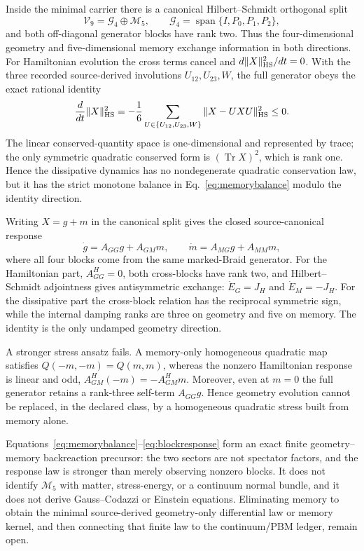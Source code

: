 \documentclass[11pt]{article}
\theoremstyle{definition}
\theoremstyle{remark}
\begin{document}
Inside the minimal carrier there is a canonical Hilbert--Schmidt orthogonal split
\begin{equation}
 \mathcal V_9=\mathcal G_4\oplus\mathcal M_5,
 \qquad \mathcal G_4=\operatorname{span}\{I,P_0,P_1,P_2\},
\end{equation}
and both off-diagonal generator blocks have rank two. Thus the four-dimensional geometry and five-dimensional memory exchange information in both directions. For Hamiltonian evolution the cross terms cancel and $d\|X\|_{\rm HS}^2/dt=0$. With the three recorded source-derived involutions $U_{12},U_{23},W$, the full generator obeys the exact rational identity
\begin{equation}\label{eq:memorybalance}
 \frac{d}{dt}\|X\|_{\rm HS}^2
 =-\frac16\sum_{U\in\{U_{12},U_{23},W\}}\|X-UXU\|_{\rm HS}^2\le0.
\end{equation}
The linear conserved-quantity space is one-dimensional and represented by trace; the only symmetric quadratic conserved form is $(\operatorname{Tr}X)^2$, which is rank one. Hence the dissipative dynamics has no nondegenerate quadratic conservation law, but it has the strict monotone balance in Eq.~\eqref{eq:memorybalance} modulo the identity direction.

Writing $X=g+m$ in the canonical split gives the closed source-canonical response
\begin{equation}\label{eq:blockresponse}
 \dot g=A_{GG}g+A_{GM}m,
 \qquad
 \dot m=A_{MG}g+A_{MM}m,
\end{equation}
where all four blocks come from the same marked-Braid generator. For the Hamiltonian part, $A^H_{GG}=0$, both cross-blocks have rank two, and Hilbert--Schmidt adjointness gives antisymmetric exchange: $\dot E_G=J_H$ and $\dot E_M=-J_H$. For the dissipative part the cross-block relation has the reciprocal symmetric sign, while the internal damping ranks are three on geometry and five on memory. The identity is the only undamped geometry direction.

A stronger stress ansatz fails. A memory-only homogeneous quadratic map satisfies $Q(-m,-m)=Q(m,m)$, whereas the nonzero Hamiltonian response is linear and odd, $A^H_{GM}(-m)=-A^H_{GM}m$. Moreover, even at $m=0$ the full generator retains a rank-three self-term $A_{GG}g$. Hence geometry evolution cannot be replaced, in the declared class, by a homogeneous quadratic stress built from memory alone.

Equations~\eqref{eq:memorybalance}--\eqref{eq:blockresponse} form an exact finite geometry--memory backreaction precursor: the two sectors are not spectator factors, and the response law is stronger than merely observing nonzero blocks. It does not identify $\mathcal M_5$ with matter, stress-energy, or a continuum normal bundle, and it does not derive Gauss--Codazzi or Einstein equations. Eliminating memory to obtain the minimal source-derived geometry-only differential law or memory kernel, and then connecting that finite law to the continuum/PBM ledger, remain open.
\end{document}
